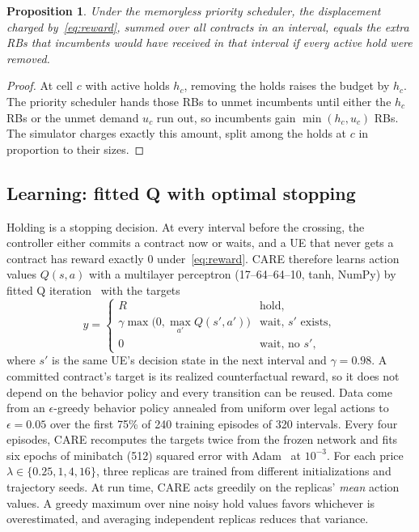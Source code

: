 \documentclass[journal]{IEEEtran}
\newtheorem{proposition}{Proposition}
\begin{document}
\begin{proposition}
Under the memoryless priority scheduler, the displacement charged by~\eqref{eq:reward}, summed over all contracts in an interval, equals the extra RBs that incumbents would have received in that interval if every active hold were removed.
\end{proposition}
\begin{proof}
At cell $c$ with active holds $h_c$, removing the holds raises the budget by $h_c$. The priority scheduler hands those RBs to unmet incumbents until either the $h_c$ RBs or the unmet demand $u_c$ run out, so incumbents gain $\min(h_c,u_c)$ RBs. The simulator charges exactly this amount, split among the holds at $c$ in proportion to their sizes.
\end{proof}

\subsection{Learning: fitted Q with optimal stopping}
Holding is a stopping decision. At every interval before the crossing, the controller either commits a contract now or waits, and a UE that never gets a contract has reward exactly $0$ under~\eqref{eq:reward}. CARE therefore learns action values $Q(s,a)$ with a multilayer perceptron (17--64--64--10, tanh, NumPy) by fitted Q iteration~\cite{sutton2018rl} with the targets
\begin{equation}\label{eq:targets}
y=\begin{cases}R & \text{hold},\\ \gamma\max\big(0,\max_{a'}Q(s',a')\big) & \text{wait, $s'$ exists},\\ 0 & \text{wait, no $s'$},\end{cases}
\end{equation}
where $s'$ is the same UE's decision state in the next interval and $\gamma=0.98$. A committed contract's target is its realized counterfactual reward, so it does not depend on the behavior policy and every transition can be reused. Data come from an $\epsilon$-greedy behavior policy annealed from uniform over legal actions to $\epsilon=0.05$ over the first 75\% of 240 training episodes of 320 intervals. Every four episodes, CARE recomputes the targets twice from the frozen network and fits six epochs of minibatch (512) squared error with Adam~\cite{kingma2015adam} at $10^{-3}$. For each price $\lambda\in\{0.25,1,4,16\}$, three replicas are trained from different initializations and trajectory seeds. At run time, CARE acts greedily on the replicas' \emph{mean} action values. A greedy maximum over nine noisy hold values favors whichever is overestimated, and averaging independent replicas reduces that variance.
\end{document}
